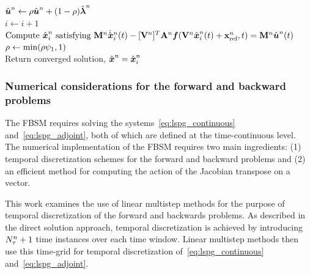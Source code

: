 \begin{algorithm}
{${\hat{\boldsymbol u}^{n}}  \leftarrow \rho {\hat{\boldsymbol u}^{n}} + (1 - \rho) \hat{\boldsymbol \lambda}^{n}$ \\
$i \leftarrow i+1$ \\
$\text{Compute }\hat{ \boldsymbol x}^{n}_i \text{ satisfying } \mathbf{M}^{n} \dot{\hat{ \boldsymbol x}}^{n}_i(t)   -  [\mathbf {V}^{n}]^T \mathbf{A}^{n} \boldsymbol f(\mathbf {V}^{n} \hat{ \boldsymbol x}^n_i(t) + \mathbf{x}_\text{ref}^{n},t) = \mathbf{M}^{n} \hat{\boldsymbol u}^{n}(t) $
\\
{
$\rho \leftarrow \text{min}(\rho \psi_1,1)$ \\
}
}
Return converged solution, $\hat{ \boldsymbol x}^{n}= \hat{ \boldsymbol x}^{n}_i$
\end{algorithm}
\subsubsection{Numerical considerations for the forward and backward problems}
The FBSM requires solving the systems~\eqref{eq:lspg_continuous} and~\eqref{eq:lspg_adjoint}, both of which are defined at the time-continuous level. 
The numerical implementation of the FBSM requires two main ingredients: (1) temporal discretization schemes for the forward and backward problems and (2) 
an efficient method for computing the action of the Jacobian transpose on a vector.  

This work examines the use of linear multistep methods for the purpose of temporal discretization of the forward and 
backwards problems. As described in  
the direct solution approach, temporal discretization is achieved by introducing $N_{\tau}^{n} + 1$ time instances over each time window. Linear multistep methods then use this time-grid for temporal discretization of~\eqref{eq:lspg_continuous} and~\eqref{eq:lspg_adjoint}. 

